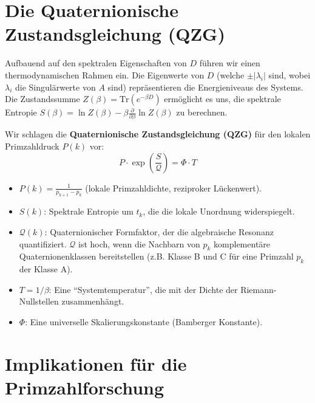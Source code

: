 \documentclass[11pt,a4paper]{article}
\newcommand{\entropy}{S}
\newcommand{\formfactor}{\mathcal{Q}}
\newcommand{\pressure}{P}
\newcommand{\temperature}{T}
\newcommand{\bamberger}{\Phi}
\theoremstyle{definition}
\begin{document}
\section{Die Quaternionische Zustandsgleichung (QZG)}
\label{sec:qzg_de}
Aufbauend auf den spektralen Eigenschaften von $D$ führen wir einen thermodynamischen Rahmen ein. Die Eigenwerte von $D$ (welche $\pm |\lambda_i|$ sind, wobei $\lambda_i$ die Singulärwerte von $A$ sind) repräsentieren die Energieniveaus des Systems. Die Zustandssumme $Z(\beta) = \text{Tr}(e^{-\beta D})$ ermöglicht es uns, die spektrale Entropie $\entropy(\beta) = \ln Z(\beta) - \beta \frac{\partial}{\partial \beta} \ln Z(\beta)$ zu berechnen.

Wir schlagen die \textbf{Quaternionische Zustandsgleichung (QZG)} für den lokalen Primzahldruck $\pressure(k)$ vor:
\begin{equation}
\label{eq:qzg_de}
\pressure \cdot \exp\left(\frac{\entropy}{\formfactor}\right) = \bamberger \cdot \temperature
\end{equation}
\begin{itemize}
    \item $\pressure(k) = \frac{1}{p_{k+1} - p_k}$ (lokale Primzahldichte, reziproker Lückenwert).
    \item $\entropy(k)$: Spektrale Entropie um $t_k$, die die lokale Unordnung widerspiegelt.
    \item $\formfactor(k)$: Quaternionischer Formfaktor, der die algebraische Resonanz quantifiziert. $\formfactor$ ist hoch, wenn die Nachbarn von $p_k$ komplementäre Quaternionenklassen bereitstellen (z.B. Klasse B und C für eine Primzahl $p_k$ der Klasse A).
    \item $\temperature = 1/\beta$: Eine ``Systemtemperatur'', die mit der Dichte der Riemann-Nullstellen zusammenhängt.
    \item $\bamberger$: Eine universelle Skalierungskonstante (Bamberger Konstante).
\end{itemize}

\section{Implikationen für die Primzahlforschung}
\label{sec:implications_de}
\end{document}
